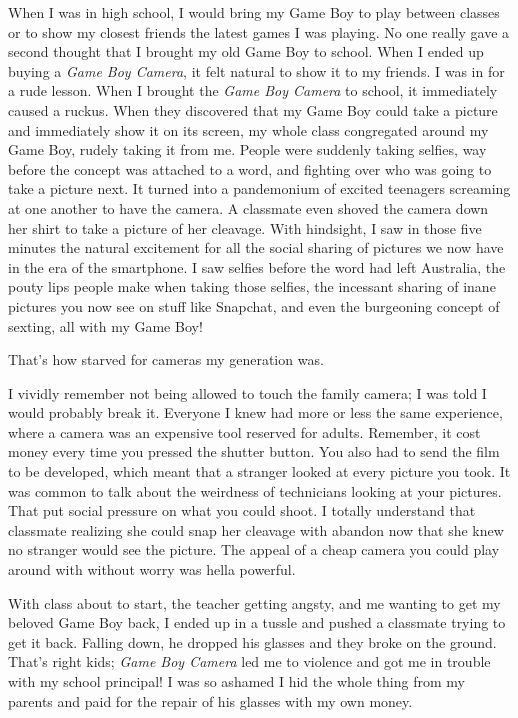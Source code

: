 \documentclass{book}
\begin{document}
When I was in high school, I would bring my Game Boy to play between classes or to show my closest friends the latest games I was playing. No one really gave a second thought that I brought my old Game Boy to school. When I ended up buying a \emph{Game Boy Camera}, it felt natural to show it to my friends. I was in for a rude lesson. When I brought the \emph{Game Boy Camera} to school, it immediately caused a ruckus. When they discovered that my Game Boy could take a picture and immediately show it on its screen, my whole class congregated around my Game Boy, rudely taking it from me. People were suddenly taking selfies, way before the concept was attached to a word, and fighting over who was going to take a picture next. It turned into a pandemonium of excited teenagers screaming at one another to have the camera. A classmate even shoved the camera down her shirt to take a picture of her cleavage. With hindsight, I saw in those five minutes the natural excitement for all the social sharing of pictures we now have in the era of the smartphone. I saw selfies before the word had left Australia, the pouty lips people make when taking those selfies, the incessant sharing of inane pictures you now see on stuff like Snapchat, and even the burgeoning concept of sexting, all with my Game Boy!

That’s how starved for cameras my generation was.

I vividly remember not being allowed to touch the family camera; I was told I would probably break it. Everyone I knew had more or less the same experience, where a camera was an expensive tool reserved for adults. Remember, it cost money every time you pressed the shutter button. You also had to send the film to be developed, which meant that a stranger looked at every picture you took. It was common to talk about the weirdness of technicians looking at your pictures. That put social pressure on what you could shoot. I totally understand that classmate realizing she could snap her cleavage with abandon now that she knew no stranger would see the picture. The appeal of a cheap camera you could play around with without worry was hella powerful.

With class about to start, the teacher getting angsty, and me wanting to get my beloved Game Boy back, I ended up in a tussle and pushed a classmate trying to get it back. Falling down, he dropped his glasses and they broke on the ground. That’s right kids; \emph{Game Boy Camera} led me to violence and got me in trouble with my school principal! I was so ashamed I hid the whole thing from my parents and paid for the repair of his glasses with my own money.
\end{document}
